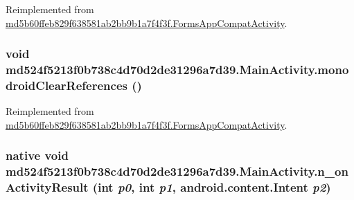 Reimplemented from \hyperlink{classmd5b60ffeb829f638581ab2bb9b1a7f4f3f_1_1_forms_app_compat_activity_1389ec337c7200cacb878f5e3c5b946c}{md5b60ffeb829f638581ab2bb9b1a7f4f3f.FormsAppCompatActivity}.\hypertarget{classmd524f5213f0b738c4d70d2de31296a7d39_1_1_main_activity_f04a2a3f5702e57b79b001a0d63ef0d8}{
\subsubsection[{monodroidClearReferences}]{\setlength{\rightskip}{0pt plus 5cm}void md524f5213f0b738c4d70d2de31296a7d39.MainActivity.monodroidClearReferences ()}}
\label{classmd524f5213f0b738c4d70d2de31296a7d39_1_1_main_activity_f04a2a3f5702e57b79b001a0d63ef0d8}




Reimplemented from \hyperlink{classmd5b60ffeb829f638581ab2bb9b1a7f4f3f_1_1_forms_app_compat_activity_8a2a2c0fe41e592284f243d8b007ecd0}{md5b60ffeb829f638581ab2bb9b1a7f4f3f.FormsAppCompatActivity}.\hypertarget{classmd524f5213f0b738c4d70d2de31296a7d39_1_1_main_activity_e6a325dab3576afac11530dd570d4f4c}{
\subsubsection[{n\_\-onActivityResult}]{\setlength{\rightskip}{0pt plus 5cm}native void md524f5213f0b738c4d70d2de31296a7d39.MainActivity.n\_\-onActivityResult (int {\em p0}, \/  int {\em p1}, \/  android.content.Intent {\em p2})}}
\label{classmd524f5213f0b738c4d70d2de31296a7d39_1_1_main_activity_e6a325dab3576afac11530dd570d4f4c}




